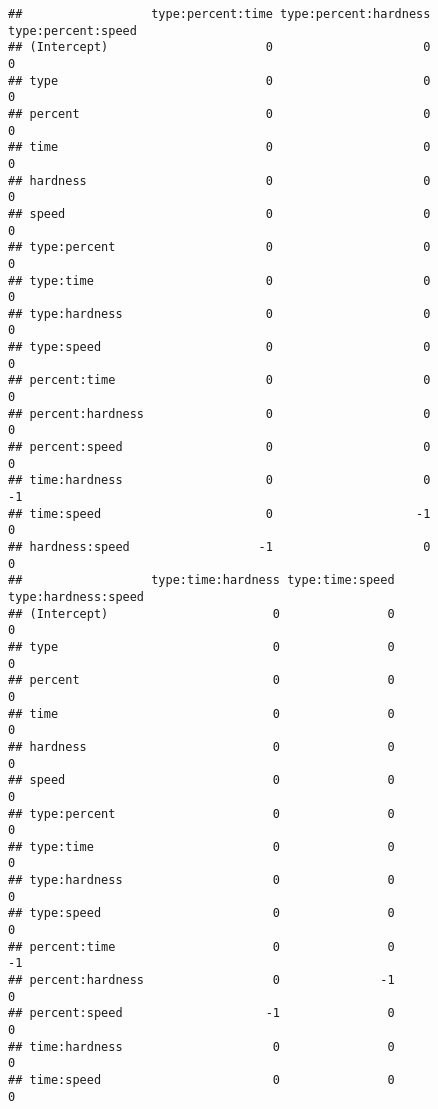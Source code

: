 \documentclass[
]{article}
\begin{document}
\begin{verbatim}
##                  type:percent:time type:percent:hardness type:percent:speed
## (Intercept)                      0                     0                  0
## type                             0                     0                  0
## percent                          0                     0                  0
## time                             0                     0                  0
## hardness                         0                     0                  0
## speed                            0                     0                  0
## type:percent                     0                     0                  0
## type:time                        0                     0                  0
## type:hardness                    0                     0                  0
## type:speed                       0                     0                  0
## percent:time                     0                     0                  0
## percent:hardness                 0                     0                  0
## percent:speed                    0                     0                  0
## time:hardness                    0                     0                 -1
## time:speed                       0                    -1                  0
## hardness:speed                  -1                     0                  0
##                  type:time:hardness type:time:speed type:hardness:speed
## (Intercept)                       0               0                   0
## type                              0               0                   0
## percent                           0               0                   0
## time                              0               0                   0
## hardness                          0               0                   0
## speed                             0               0                   0
## type:percent                      0               0                   0
## type:time                         0               0                   0
## type:hardness                     0               0                   0
## type:speed                        0               0                   0
## percent:time                      0               0                  -1
## percent:hardness                  0              -1                   0
## percent:speed                    -1               0                   0
## time:hardness                     0               0                   0
## time:speed                        0               0                   0

\end{verbatim}
\end{document}
